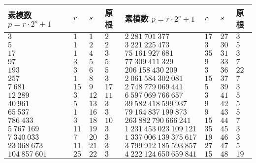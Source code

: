 \begin{tabular}{llll|llll}
    \hline
    素模数 \(p=r\cdot 2^s+1\)  & \(r\)   & \(s\)  & 原根   & 素模数 \(p=r\cdot 2^s+1\)     & \(r\)  & \(s\)  & 原根   \\
    \hline
    \(3\)                      & \(1\)   & \(1\)  & \(2\)  & \(2~281~701~377\)             & \(17\) & \(27\) & \(3\)  \\
    \(5\)                      & \(1\)   & \(2\)  & \(2\)  & \(3~221~225~473\)             & \(3\)  & \(30\) & \(5\)  \\
    \(17\)                     & \(1\)   & \(4\)  & \(3\)  & \(75~161~927~681\)            & \(35\) & \(31\) & \(3\)  \\
    \(97\)                     & \(3\)   & \(5\)  & \(5\)  & \(77~309~411~329\)            & \(9\)  & \(33\) & \(7\)  \\
    \(193\)                    & \(3\)   & \(6\)  & \(5\)  & \(206~158~430~209\)           & \(3\)  & \(36\) & \(22\) \\
    \(257\)                    & \(1\)   & \(8\)  & \(3\)  & \(2~061~584~302~081\)         & \(15\) & \(37\) & \(7\)  \\
    \(7~681\)                  & \(15\)  & \(9\)  & \(17\) & \(2~748~779~069~441\)         & \(5\)  & \(39\) & \(3\)  \\
    \(12~289\)                 & \(3\)   & \(12\) & \(11\) & \(6~597~069~766~657\)         & \(3\)  & \(41\) & \(5\)  \\
    \(40~961\)                 & \(5\)   & \(13\) & \(3\)  & \(39~582~418~599~937\)        & \(9\)  & \(42\) & \(5\)  \\
    \(65~537\)                 & \(1\)   & \(16\) & \(3\)  & \(79~164~837~199~873\)        & \(9\)  & \(43\) & \(5\)  \\
    \(786~433\)                & \(3\)   & \(18\) & \(10\) & \(263~882~790~666~241\)       & \(15\) & \(44\) & \(7\)  \\
    \(5~767~169\)              & \(11\)  & \(19\) & \(3\)  & \(1~231~453~023~109~121\)     & \(35\) & \(45\) & \(3\)  \\
    \(7~340~033\)              & \(7\)   & \(20\) & \(3\)  & \(1~337~006~139~375~617\)     & \(19\) & \(46\) & \(3\)  \\
    \(23~068~673\)             & \(11\)  & \(21\) & \(3\)  & \(3~799~912~185~593~857\)     & \(27\) & \(47\) & \(5\)  \\
    \(104~857~601\)            & \(25\)  & \(22\) & \(3\)  & \(4~222~124~650~659~841\)     & \(15\) & \(48\) & \(19\) \\

\end{tabular}
